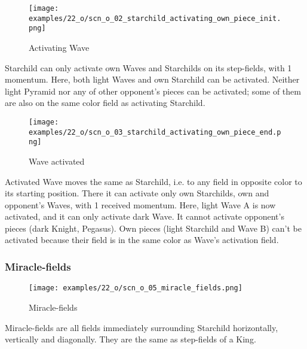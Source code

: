 \vspace*{-1.1\baselineskip}
\noindent
\begin{figure}[!h]
\texttt{[image: examples/22\_o/scn\_o\_02\_starchild\_activating\_own\_piece\_init.png]}
\caption{Activating Wave}
\label{fig:scn_o_02_starchild_activating_own_piece_init}
\end{figure}

Starchild can only activate own Waves and Starchilds on its step-fields, with 1
momentum. Here, both light Waves and own Starchild can be activated. Neither light
Pyramid nor any of other opponent's pieces can be activated; some of them are also
on the same color field as activating Starchild.

\clearpage %

\vspace*{-2.1\baselineskip}
\noindent
\begin{figure}[!h]
\texttt{[image: examples/22\_o/scn\_o\_03\_starchild\_activating\_own\_piece\_end.png]}
\vspace*{-1.3\baselineskip}
\caption{Wave activated}
\label{fig:scn_o_03_starchild_activating_own_piece_end}
\end{figure}

\vspace*{-0.3\baselineskip}
Activated Wave moves the same as Starchild, i.e. to any field in opposite color to
its starting position. There it can activate only own Starchilds, own and opponent's
Waves, with 1 received momentum. \newline
\indent
Here, light Wave A is now activated, and it can only activate dark Wave. It cannot
activate opponent's pieces (dark Knight, Pegasus). Own pieces (light Starchild and
Wave B) can't be activated because their field is in the same color as Wave's
activation field.

\clearpage %

\subsubsection*{Miracle-fields}
\label{sec:One/Starchild/Movement/Miracle-fields}

\noindent
\begin{wrapfigure}[5]{l}{0.4\textwidth}
\centering
\texttt{[image: examples/22\_o/scn\_o\_05\_miracle\_fields.png]}
\caption{Miracle-fields}
\label{fig:scn_o_05_miracle_fields}
\end{wrapfigure}
Miracle-fields are all fields immediately surrounding Starchild horizontally,
vertically and diagonally. They are the same as step-fields of a King.

